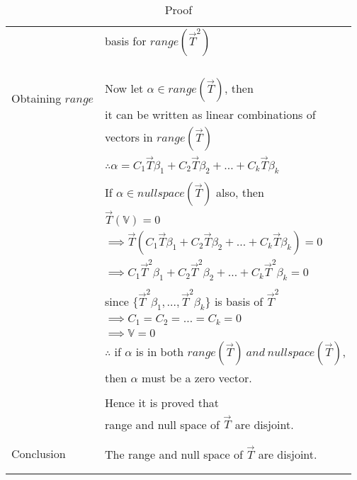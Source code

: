 \documentclass[journal,12pt]{IEEEtran}
\begin{document}
\begin{longtable}{|l|l|}
& basis for $range(\vec{T}^2)$\\
& \\
& \\
& \\
\hline
\multirow{3}{*}{Obtaining $range $} & \\
& Now let $\alpha \in range(\vec{T})$, then\\
$ and \  nullspace \  of \  \vec{T}$
& it can be written as linear combinations of \\
& vectors in $ range(\vec{T})$\\
& $\therefore \alpha = C_1\vec{T}\beta_1+C_2\vec{T}\beta_2+\ldots+C_k\vec{T}\beta_k$\\
& \\
& If $\alpha \in null space (\vec{T})$ also, then\\
& $ \vec{T}(\mathbb{V}) = 0$\\
& $\implies \vec{T}(C_1\vec{T}\beta_1+C_2\vec{T}\beta_2+\ldots+C_k\vec{T}\beta_k) = 0$\\
& $ \implies C_1\vec{T}^2\beta_1+C_2\vec{T}^2\beta_2+\ldots+C_k\vec{T}^2\beta_k = 0$\\
& \\
& since $\lbrace \vec{T}^2\beta_1,\ldots,\vec{T}^2\beta_k \rbrace$ is basis of $\vec{T}^2$\\
& $\implies C_1 = C_2 = \ldots = C_k = 0$\\
& $\implies \mathbb{V} = 0$\\
& $\therefore$ if $\alpha$  is in both $ range(\vec{T}) \  and \  null space(\vec{T})$, \\
& then $\alpha$ must be a zero vector.\\
& \\
& Hence it is proved that \\
& range and null space of $\vec{T}$ are disjoint.\\
&\\
\hline
\multirow{3}{*}{Conclusion} & \\
& The range and null space of $\vec{T}$ are disjoint.\\
&\\
\hline
\caption{Proof}
\label{table:1}
\end{longtable}
\newpage
\end{document}
